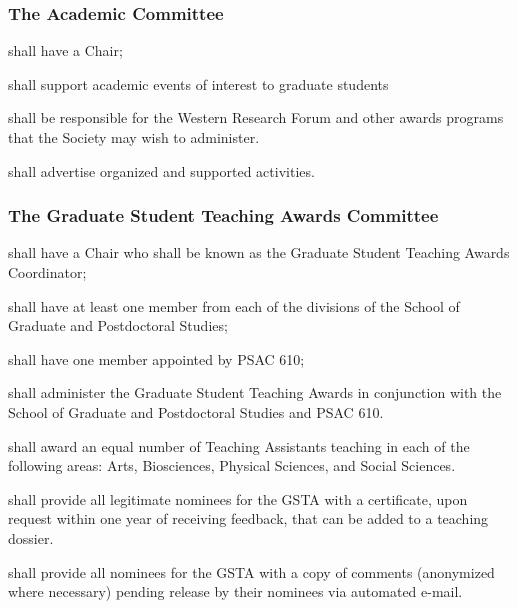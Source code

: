     
\subsubsection{The Academic Committee}

\begin{longenum}[ label*=\thesubsubsection.\arabic*., align=left]
	\item shall have a Chair;
    \item shall support academic events of interest to graduate students
    \item shall be responsible for the Western Research Forum and other awards programs that the Society may wish to administer.
    \item shall advertise organized and supported activities.

\end{longenum}

\subsubsection{The Graduate Student Teaching Awards Committee}
\begin{longenum}[ label*=\thesubsubsection.\arabic*., align=left]
	\item shall have a Chair who shall be known as the Graduate Student Teaching Awards Coordinator;
    \item shall have at least one member from each of the divisions of the School of Graduate and Postdoctoral Studies;
    \item shall have one member appointed by PSAC 610;
    \item shall administer the Graduate Student Teaching Awards in conjunction with the School of Graduate and Postdoctoral Studies and PSAC 610.
    \item shall award an equal number of Teaching Assistants teaching in each of the following areas: Arts, Biosciences, Physical Sciences, and Social Sciences.
\item shall provide all legitimate nominees for the GSTA with a certificate, upon request within one year of receiving feedback, that can be added to a teaching
dossier.
\item shall provide all nominees for the GSTA with a copy of comments (anonymized where necessary) pending
release by their nominees via automated e-mail.

\end{longenum}

